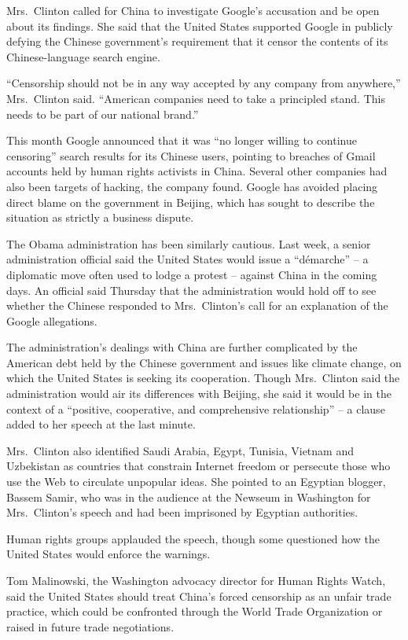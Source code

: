﻿\documentclass[12pt]{article}
\begin{document}
Mrs.~Clinton called for China to investigate Google's accusation and be open about its findings. She
said that the United States supported Google in publicly defying the Chinese government's
requirement that it censor the contents of its Chinese-language search engine.

``Censorship should not be in any way accepted by any company from anywhere,'' Mrs.~Clinton said.
``American companies need to take a principled stand. This needs to be part of our national brand.''

This month Google announced that it was ``no longer willing to continue censoring'' search results
for its Chinese users, pointing to breaches of Gmail accounts held by human rights activists in
China. Several other companies had also been targets of hacking, the company found. Google has
avoided placing direct blame on the government in Beijing, which has sought to describe the
situation as strictly a business dispute.

The Obama administration has been similarly cautious. Last week, a senior administration official
said the United States would issue a ``d\'emarche'' -- a diplomatic move often used to lodge a
protest -- against China in the coming days. An official said Thursday that the administration would
hold off to see whether the Chinese responded to Mrs.~Clinton's call for an explanation of the
Google allegations.

The administration's dealings with China are further complicated by the American debt held by the
Chinese government and issues like climate change, on which the United States is seeking its
cooperation. Though Mrs.~Clinton said the administration would air its differences with Beijing, she
said it would be in the context of a ``positive, cooperative, and comprehensive relationship'' -- a
clause added to her speech at the last minute.

Mrs.~Clinton also identified Saudi Arabia, Egypt, Tunisia, Vietnam and Uzbekistan as countries that
constrain Internet freedom or persecute those who use the Web to circulate unpopular ideas. She
pointed to an Egyptian blogger, Bassem Samir, who was in the audience at the Newseum in Washington
for Mrs.~Clinton's speech and had been imprisoned by Egyptian authorities.

Human rights groups applauded the speech, though some questioned how the United States would enforce
the warnings.

Tom Malinowski, the Washington advocacy director for Human Rights Watch, said the United States
should treat China's forced censorship as an unfair trade practice, which could be confronted
through the World Trade Organization or raised in future trade negotiations.
\end{document}

